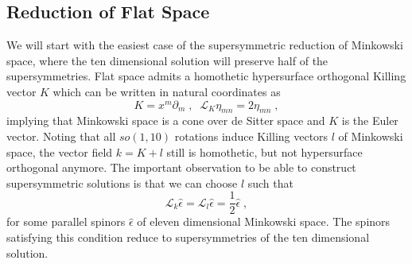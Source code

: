 \documentclass[a4paper,12pt]{article}
\newcommand{\ft}[2]{{\textstyle\frac{#1}{#2}}}
\begin{document}
\subsection{Reduction of Flat Space}
We will start with the easiest case of the supersymmetric reduction of Minkowski space, where the ten dimensional solution will preserve half of the supersymmetries.
Flat space admits a homothetic hypersurface orthogonal Killing vector $K$ which can be written in natural coordinates as 
\begin{equation}
K=x^m \partial_m \; , \; \; \mathcal{L}_K\eta_{mn}=2\eta_{mn}\; ,
\end{equation}
implying that Minkowski space is a cone over de Sitter space and $K$ is the Euler vector.
 Noting that all $so(1,10)$ rotations induce Killing vectors $l$ of Minkowski space, the vector field 
 $k=K+l$ still is homothetic, but not hypersurface orthogonal anymore. The important observation to be able 
 to construct supersymmetric solutions is that we can choose $l$ such that 
\begin{equation}
\mathcal{L}_k\hat{\epsilon}=\mathcal{L}_l \hat{\epsilon}=\ft12 \hat{\epsilon}\; ,
\end{equation}
for some parallel spinors $\hat{\epsilon}$ of eleven dimensional Minkowski space. The spinors satisfying this condition reduce to supersymmetries of the ten dimensional solution.
\end{document}
